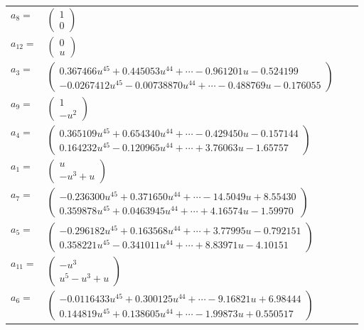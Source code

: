 \documentclass[1p]{elsarticle_modified}
\theoremstyle{definition}
\begin{document}
\begin{tabular}{m{7pt} m{180pt} m{7pt} m{180pt} }
\flushright $a_{8}=$&$\begin{pmatrix}1\\0\end{pmatrix}$ \\
\flushright $a_{12}=$&$\begin{pmatrix}0\\u\end{pmatrix}$ \\
\flushright $a_{3}=$&$\begin{pmatrix}0.367466 u^{45}+0.445053 u^{44}+\cdots-0.961201 u-0.524199\\-0.0267412 u^{45}-0.00738870 u^{44}+\cdots-0.488769 u-0.176055\end{pmatrix}$ \\
\flushright $a_{9}=$&$\begin{pmatrix}1\\- u^2\end{pmatrix}$ \\
\flushright $a_{4}=$&$\begin{pmatrix}0.365109 u^{45}+0.654340 u^{44}+\cdots-0.429450 u-0.157144\\0.164232 u^{45}-0.120965 u^{44}+\cdots+3.76063 u-1.65757\end{pmatrix}$ \\
\flushright $a_{1}=$&$\begin{pmatrix}u\\- u^3+u\end{pmatrix}$ \\
\flushright $a_{7}=$&$\begin{pmatrix}-0.236300 u^{45}+0.371650 u^{44}+\cdots-14.5049 u+8.55430\\0.359878 u^{45}+0.0463945 u^{44}+\cdots+4.16574 u-1.59970\end{pmatrix}$ \\
\flushright $a_{5}=$&$\begin{pmatrix}-0.296182 u^{45}+0.163568 u^{44}+\cdots+3.77995 u-0.792151\\0.358221 u^{45}-0.341011 u^{44}+\cdots+8.83971 u-4.10151\end{pmatrix}$ \\
\flushright $a_{11}=$&$\begin{pmatrix}- u^3\\u^5- u^3+u\end{pmatrix}$ \\
\flushright $a_{6}=$&$\begin{pmatrix}-0.0116433 u^{45}+0.300125 u^{44}+\cdots-9.16821 u+6.98444\\0.144819 u^{45}+0.138605 u^{44}+\cdots-1.99873 u+0.550517\end{pmatrix}$ \\

\end{tabular}
\end{document}
